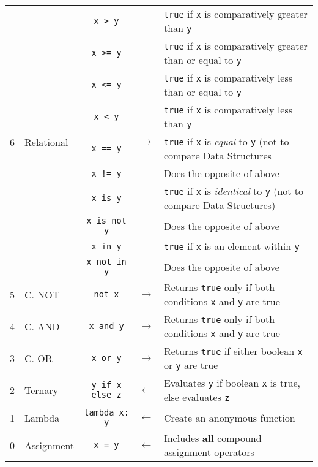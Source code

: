 \documentclass{article}
\begin{document}
\begin{center}
\begin{tabularx}{\textwidth}{clccX}
\multirow{10}{*}{6} & \multirow{10}{*}{Relational} & \lstinline|x > y| & \multirow{10}{*}{\(\to\)} & \lstinline|true| if \lstinline|x| is comparatively greater than \lstinline|y| \\
& & \lstinline|x >= y| & & \lstinline|true| if \lstinline|x| is comparatively greater than or equal to \lstinline|y| \\
& & \lstinline|x <= y| & & \lstinline|true| if \lstinline|x| is comparatively less than or equal to \lstinline|y| \\
& & \lstinline|x < y| & & \lstinline|true| if \lstinline|x| is comparatively less than \lstinline|y| \\
& & \lstinline|x == y| & & \lstinline|true| if \lstinline|x| is \textit{equal} to \lstinline|y| (not to compare Data Structures\\
& & \lstinline|x != y|    &  & Does the opposite of above\\
& & \lstinline|x is y| & & \lstinline|true| if \lstinline|x| is \textit{identical} to \lstinline|y| (not to compare Data Structures)\\
& & \lstinline|x is not y| & & Does the opposite of above\\
& & \lstinline|x in y| & & \lstinline|true| if \lstinline|x| is an element within \lstinline|y|\\
& & \lstinline|x not in y| & & Does the opposite of above\\\midrule

5 & C. NOT            & \lstinline|not x|  & \(\to\) & Returns \lstinline|true| only if both conditions \lstinline|x| and \lstinline|y| are true\\\midrule
4 & C. AND            & \lstinline|x and y|& \(\to\) & Returns \lstinline|true| only if both conditions \lstinline|x| and \lstinline|y| are true\\\midrule
3 & C. OR             & \lstinline|x or y| & \(\to\) & Returns \lstinline|true| if either boolean \lstinline|x| or \lstinline|y| are true\\\midrule
2 & Ternary           & \lstinline|y if x else z| & \(\gets\) & Evaluates \lstinline|y| if boolean \lstinline|x| is true, else evaluates \lstinline|z|\\\midrule

1 & Lambda            & \lstinline|lambda x: y| & \(\gets\) & Create an anonymous function\\\midrule
0 & Assignment        & \lstinline|x = y| & \(\gets\) & Includes \textbf{all} compound assignment operators\\\midrule
\end{tabularx}\end{center}
\end{document}
